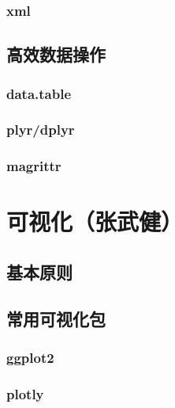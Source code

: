 \documentclass[]{book}
\begin{document}
\hypertarget{xml}{%
\subsection{xml}\label{xml}}

\hypertarget{section-32}{%
\section{高效数据操作}\label{section-32}}

\hypertarget{data.table}{%
\subsection{data.table}\label{data.table}}

\hypertarget{plyrdplyr}{%
\subsection{plyr/dplyr}\label{plyrdplyr}}

\hypertarget{magrittr}{%
\subsection{magrittr}\label{magrittr}}

\hypertarget{section-33}{%
\chapter{可视化（张武健）}\label{section-33}}

\hypertarget{section-34}{%
\section{基本原则}\label{section-34}}

\hypertarget{section-35}{%
\section{常用可视化包}\label{section-35}}

\hypertarget{ggplot2}{%
\subsection{ggplot2}\label{ggplot2}}

\hypertarget{plotly}{%
\subsection{plotly}\label{plotly}}
\end{document}
